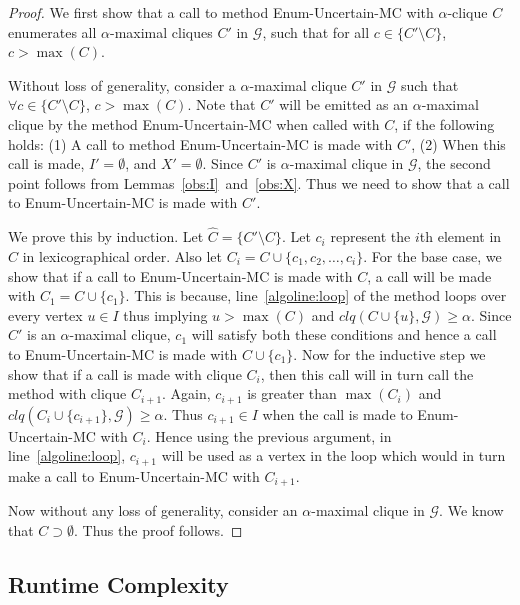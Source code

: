 \documentclass[11pt,letterpaper]{article}
\newcommand{\ugraph}{\mathcal{G}}
\newcommand{\cliqueprob}{clq}
\begin{document}
\begin{proof}
We first show that a call to method Enum-Uncertain-MC with $\alpha$-clique $C$ enumerates all $\alpha$-maximal cliques $C'$ in $\ugraph$, such that for all $c \in \{ C' \setminus C \}$, $c > \max(C)$.

Without loss of generality, consider a $\alpha$-maximal clique $C'$ in $\ugraph$ such that $\forall c \in \{C' \setminus C \}$, $c > \max(C)$. Note that $C'$ will be emitted as an $\alpha$-maximal clique by the method Enum-Uncertain-MC when called with $C$, if the following holds: (1) A call to method Enum-Uncertain-MC is made with $C'$, (2) When this call is made, $I' = \emptyset$, and $X' = \emptyset$. Since $C'$ is $\alpha$-maximal clique in $\ugraph$, the second point follows from Lemmas~\ref{obs:I}~and~\ref{obs:X}. Thus we need to show that a call to Enum-Uncertain-MC is made with $C'$.

We prove this by induction.
Let $\hat{C} = \{ C' \setminus C \}$.
Let $c_i$ represent the $i$th element in $\hat{C}$ in lexicographical order.
Also let $C_i = C \cup \{ c_{1}, c_{2}, \ldots, c_i \}$.
For the base case, we show that if a call to Enum-Uncertain-MC is made with $C$,
a call will be made with $C_1 = C \cup \{ c_1 \}$. This is because, 
line~\ref{algoline:loop} of the method loops over every vertex $u \in I$ thus
implying $u > \max(C)$ and $\cliqueprob(C \cup \{ u \},\ugraph) \ge \alpha$.
Since $C'$ is an $\alpha$-maximal clique, $c_1$ will satisfy both these
conditions and hence a call to Enum-Uncertain-MC is made with $C \cup \{ c_1 \}$.
Now for the inductive step we show that if a call is made with clique
$C_i$, then this call will in turn call the method with clique $C_{i+1}$.
Again, $c_{i+1}$ is greater than $\max(C_i)$ and 
$\cliqueprob(C_i \cup \{ c_{i+1} \},\ugraph) \ge \alpha$. 
Thus $c_{i+1} \in I$ when the call is made to Enum-Uncertain-MC with $C_i$.
Hence using the previous argument, in line~\ref{algoline:loop}, $c_{i+1}$ will be used as 
a vertex in the loop which would in turn make a call to Enum-Uncertain-MC with $C_{i+1}$. 

Now without any loss of generality, consider an $\alpha$-maximal clique in $\ugraph$.
We know that $C \supset \emptyset$. Thus the proof follows. 
\end{proof}

\subsection{Runtime Complexity}
\end{document}

